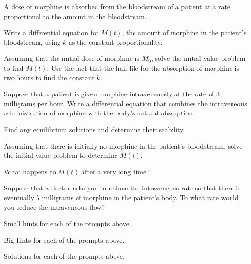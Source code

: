 \begin{activity} \label{A:7.4.skydiver}  
      \item A dose of morphine is 
        absorbed from the bloodstream of a patient at a rate
        proportional to the amount in the bloodstream.  

        \ba
        \item Write a differential equation for $M(t)$, the amount of
          morphine in the patient's bloodstream, using $k$ as the
          constant proportionality.
        \item 
          Assuming that the initial dose of morphine is $M_0$,
          solve the initial value problem to find $M(t)$.  Use the
          fact that the half-life for the absorption of morphine is
          two hours to find the constant $k$.
        \item Suppose that a patient is given morphine intraveneously
          at the rate of 3 milligrams per hour.  Write a differential
          equation that combines the intraveneous administration of
          morphine with the body's natural absorption.
        \item Find any equilibrium solutions and determine their
          stability. 
        \item Assuming that there is initially no morphine in the
          patient's bloodstream, solve the initial value problem to
          determine $M(t)$.
        \item What happens to $M(t)$ after a very long time?
        \item Suppose that a doctor asks you to reduce the
          intraveneous rate so that there is eventually 7 milligrams
          of morphine in the patient's body.  To what rate would you reduce
          the intraveneous flow?
        \ea





\ea
\end{activity}
\begin{smallhint}
\ba
	\item Small hints for each of the prompts above.
\ea
\end{smallhint}
\begin{bighint}
\ba
	\item Big hints for each of the prompts above.
\ea
\end{bighint}
\begin{activitySolution}
\ba
	\item Solutions for each of the prompts above.
\ea
\end{activitySolution}
\aftera
